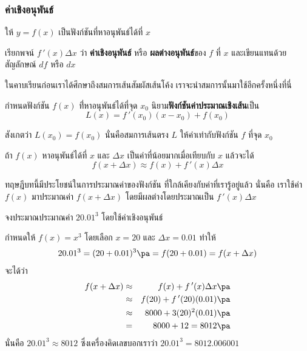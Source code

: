 \begin{frame}
\frametitle{ค่าเชิงอนุพันธ์}
\begin{defn}{}{}
ให้  $y= f(x)$ เป็นฟังก์ชันที่หาอนุพันธ์ได้ที่ $x$  

เรียกพจน์ $f\,'(x) \Delta x$ ว่า \textbf{ค่าเชิงอนุพันธ์} หรือ \textbf{ผลต่างอนุพันธ์}ของ $f$  ที่ $x$  และเขียนแทนด้วยสัญลักษณ์ $df$ หรือ $dx$
\end{defn} \pa
\end{frame}

\begin{frame}
ในคาบเรียนก่อนเราได้ศึกษาถึงสมการเส้นสัมผัสเส้นโค้ง เราจะนำสมการนั้นมาใช้อีกครั้งหนึ่งที่นี่
\begin{defn}{}{}
กำหนดฟังก์ชัน $f(x)$ ที่่หาอนุพันธ์ได้ที่จุด $x_0$ นิยาม\textbf{ฟังก์ชันค่าประมาณเชิงเส้น}เป็น
\begin{equation}
L(x) = f\,'(x_0) (x-x_0) + f(x_0)
\end{equation}
\end{defn}
สังเกตว่า $L(x_0) = f(x_0)$ นั่นคือสมการเส้นตรง $L$ ให้ค่าเท่ากับฟังก์ชัน $f$ ที่จุด $x_0$
\end{frame}

\begin{frame}
\end{frame}

\begin{frame}
\begin{thm}{}{}
ถ้า $f(x)$ หาอนุพันธ์ได้ที่ $x$ และ $\Delta x$ เป็นค่าที่น้อยมากเมื่อเทียบกับ $x$ \pa แล้วจะได้
\[ f(x+\Delta x) \approx f(x) + f\,'(x) \Delta x\]
\end{thm}\pa
ทฤษฎีบทนี้มีประโยชน์ในการประมาณค่าของฟังก์ชัน ที่ใกล้เคียงกับค่าที่เรารู้อยู่แล้ว \pa นั่นคือ เราใช้ค่า $f(x)$ มาประมาณค่า $f(x+\Delta x)$ โดยมีผลต่างโดยประมาณเป็น $f\,'(x) \Delta x$
\end{frame}
 

\begin{frame}[t]
\begin{ex}
จงประมาณประมาณค่า $20.01^3$ โดยใช้ค่าเชิงอนุพันธ์
\end{ex}\pa
\begin{sol}
กำหนดให้ $f(x) = x^3$ \pa โดยเลือก $x = 20$ และ $\Delta x = 0.01$ \pa ทำให้ 
\[20.01^3 = (20 + 0.01)^3 \pa = f(20+0.01) = f(x + \Delta x)\]
จะได้ว่า 
\begin{eqnarray*}
f(x+\Delta x) &\approx& f(x) + f\,'(x) \Delta x \pa \\
&\approx& f(20) + f\,'(20) (0.01) \pa \\
&\approx& 8000 + 3(20)^2 (0.01) \pa \\
&=& 8000 + 12 = 8012  \pa
\end{eqnarray*}
นั่นคือ $20.01^3 \approx 8012$ \pa ซึ่งเครื่องคิดเลขบอกเราว่า $20.01^3 = 8012.006001$
\end{sol}
\end{frame}


